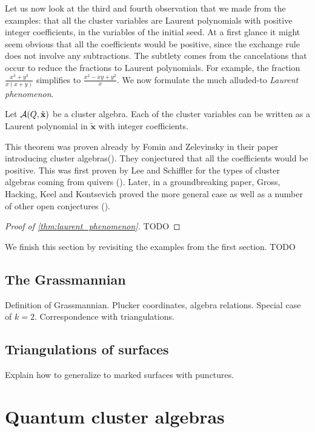 \documentclass{article}
\newcommand{\bx}{\mathbf{x}}
\newcommand{\tbx}{\tilde{\bx}}
\begin{document}
Let us now look at the third and fourth observation that we made from the examples:
that all the cluster variables are Laurent polynomials with positive integer
coefficients, in the variables of the initial seed. At a first glance it might seem
obvious that all the coefficients would be positive, since the exchange rule does not
involve any subtractions. The subtlety comes from the cancelations that occur to reduce
the fractions to Laurent polynomials. For example, the fraction $\frac{x^3 +
		y^3}{x(x+y)}$ simplifies to $\frac{x^2 - xy + y^2}{x}$. We now formulate the much
alluded-to \emph{Laurent phenomenon}.
\begin{theorem}\label{thm:laurent_phenomenon}
	Let $\mcA (Q, \tbx)$ be a cluster algebra. Each of the cluster variables can be written as a Laurent polynomial in $\tbx$ with integer coefficients.
\end{theorem}
This theorem was proven already by Fomin and Zelevinsky in their paper introducing cluster algebras(\cite[Theorem 3.1]{FominZelevinsky2002CAF}). They conjectured that all the coefficients would be positive. This was first proven by Lee and Schiffler for the types of cluster algebras coming from quivers (\cite{LeeSchiffler2015PositivityCA}). Later, in a groundbreaking paper, Gross, Hacking, Keel and Kontsevich proved the more general case as well as a number of other open conjectures (\cite{GrossHackingKeelKontsevich2018CanonicalBCA}).

\begin{proof}[Proof of \cref{thm:laurent_phenomenon}]
	TODO
\end{proof}

We finish this section by revisiting the examples from the first section. TODO

\subsection{The Grassmannian}
Definition of Grassmannian. Plucker coordinates, algebra relations. Special case of
$k=2$. Correspondence with triangulations.
\subsection{Triangulations of surfaces}
Explain how to generalize to marked surfaces with punctures.
\section{Quantum cluster algebras}
\end{document}
